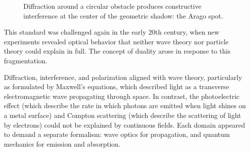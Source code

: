 \begin{figure}[h]
\centering
{}
\caption{Diffraction around a circular obstacle produces constructive interference at the center of the geometric shadow: the Arago spot.}
\end{figure}

This standard was challenged again in the early 20th century, when new experiments revealed optical behavior that neither wave theory nor particle theory could explain in full. The concept of duality arose in response to this fragmentation.

Diffraction, interference, and polarization aligned with wave theory, particularly as formulated by Maxwell's equations, which described light as a transverse electromagnetic wave propagating through space. In contrast, the photoelectric effect (which describe the rate in which photons are emitted when light shines on a metal surface) and Compton scattering (which describe the scattering of light by electrons) could not be explained by continuous fields. Each domain appeared to demand a separate formalism: wave optics for propagation, and quantum mechanics for emission and absorption.

